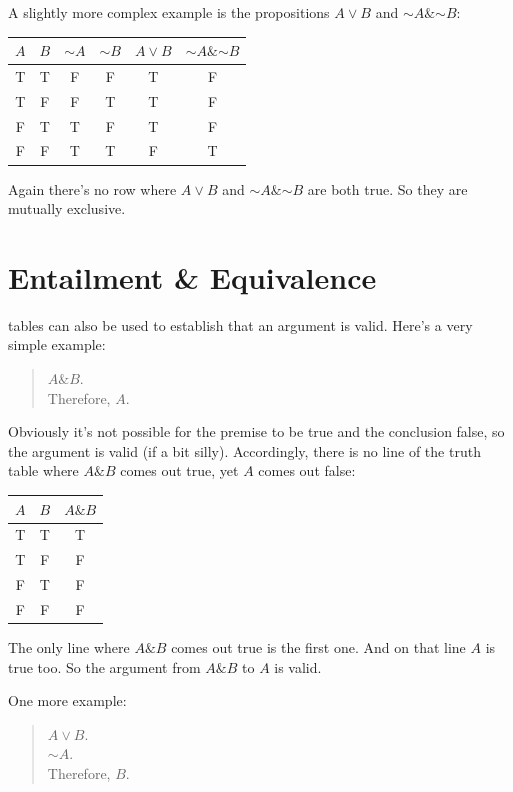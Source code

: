 \documentclass[justified]{tufte-book}
\renewcommand{\neg}{\mathbin{\sim}}
\renewcommand{\wedge}{\mathbin{\&}}
\theoremstyle{definition}
\theoremstyle{definition}
\theoremstyle{definition}
\theoremstyle{remark}
\begin{document}
A slightly more complex example is the propositions \(A \vee B\) and \(\neg A \wedge \neg B\):
\begin{center}
\begin{tabular}{cccccc}
\toprule
\(A\) & \(B\) & \(\neg A\) & \(\neg B\) & \(A \vee B\) & \(\neg A \wedge \neg B\)\tabularnewline
\midrule
T & T & F & F & T & F\tabularnewline
T & F & F & T & T & F\tabularnewline
F & T & T & F & T & F\tabularnewline
F & F & T & T & F & T\tabularnewline
\bottomrule
\end{tabular}
\end{center}
\noindent Again there's no row where \(A \vee B\) and \(\neg A \wedge \neg B\) are both true. So they are mutually exclusive.

\hypertarget{entailment-equivalence}{%
\section{Entailment \& Equivalence}\label{entailment-equivalence}}

 tables can also be used to establish that an argument is valid. Here's a very simple example:

\begin{quote}
\(A \wedge B\).\\
Therefore, \(A\).
\end{quote}

Obviously it's not possible for the premise to be true and the conclusion false, so the argument is valid (if a bit silly). Accordingly, there is no line of the truth table where \(A \wedge B\) comes out true, yet \(A\) comes out false:
\begin{longtable}[]{@{}ccc@{}}
\toprule
\(A\) & \(B\) & \(A \wedge B\)\tabularnewline
\midrule
\endhead
T & T & T\tabularnewline
T & F & F\tabularnewline
F & T & F\tabularnewline
F & F & F\tabularnewline
\bottomrule
\end{longtable}
The only line where \(A \wedge B\) comes out true is the first one. And on that line \(A\) is true too. So the argument from \(A \wedge B\) to \(A\) is valid.

One more example:

\begin{quote}
\(A \vee B\).\\
\(\neg A\).\\
Therefore, \(B\).
\end{quote}
\end{document}
